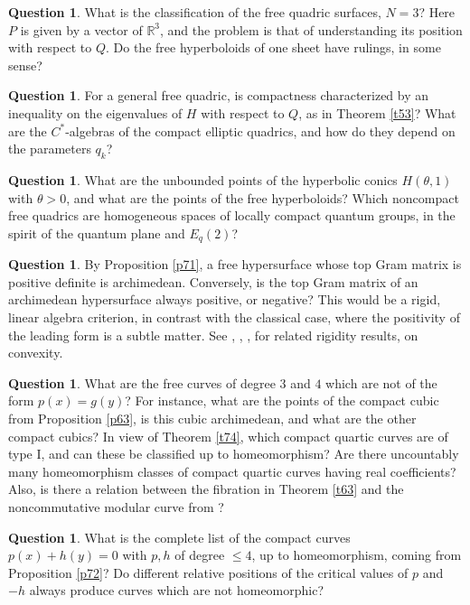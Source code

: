 \documentclass[11pt]{amsart}
\theoremstyle{definition}
\newtheorem{question}[theorem]{Question}
\begin{document}
\begin{question}
What is the classification of the free quadric surfaces, $N=3$? Here $P$ is given by a vector of $\mathbb R^3$, and the problem is that of understanding its position with respect to $Q$. Do the free hyperboloids of one sheet have rulings, in some sense?
\end{question}

\begin{question}
For a general free quadric, is compactness characterized by an inequality on the eigenvalues of $H$ with respect to $Q$, as in Theorem \ref{t53}? What are the $C^*$-algebras of the compact elliptic quadrics, and how do they depend on the parameters $q_k$?
\end{question}

\begin{question}
What are the unbounded points of the hyperbolic conics $H(\theta,1)$ with $\theta>0$, and what are the points of the free hyperboloids? Which noncompact free quadrics are homogeneous spaces of locally compact quantum groups, in the spirit of the quantum plane and $E_q(2)$?
\end{question}

\begin{question}
By Proposition \ref{p71}, a free hypersurface whose top Gram matrix is positive definite is archimedean. Conversely, is the top Gram matrix of an archimedean hypersurface always positive, or negative? This would be a rigid, linear algebra criterion, in contrast with the classical case, where the positivity of the leading form is a subtle matter. See \cite{dhm}, \cite{hkv}, \cite{hm2}, \cite{hm3} for related rigidity results, on convexity.
\end{question}

\begin{question}
What are the free curves of degree $3$ and $4$ which are not of the form $p(x)=g(y)$? For instance, what are the points of the compact cubic from Proposition \ref{p63}, is this cubic archimedean, and what are the other compact cubics? In view of Theorem \ref{t74}, which compact quartic curves are of type I, and can these be classified up to homeomorphism? Are there uncountably many homeomorphism classes of compact quartic curves having real coefficients? Also, is there a relation between the fibration in Theorem \ref{t63} and the noncommutative modular curve from \cite{mma}?
\end{question}

\begin{question}
What is the complete list of the compact curves $p(x)+h(y)=0$ with $p,h$ of degree $\leq4$, up to homeomorphism, coming from Proposition \ref{p72}? Do different relative positions of the critical values of $p$ and $-h$ always produce curves which are not homeomorphic?
\end{question}
\end{document}
